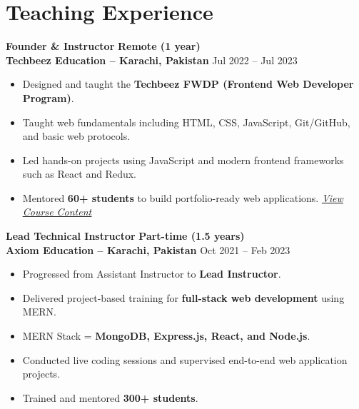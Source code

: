 \documentclass[a4paper,12pt]{article}
\begin{document}
\section*{Teaching Experience}
\vspace{2pt}

\textbf{Founder \& Instructor} \hfill \textbf{Remote (1 year)} \\
\textbf{Techbeez Education – Karachi, Pakistan} \hfill Jul 2022 -- Jul 2023
\begin{itemize}
    \item Designed and taught the \textbf{Techbeez FWDP (Frontend Web Developer Program)}.
    \item Taught web fundamentals including HTML, CSS, JavaScript, Git/GitHub, and basic web protocols.
    \item Led hands-on projects using JavaScript and modern frontend frameworks such as React and Redux.
    \item Mentored \textbf{60+ students} to build portfolio-ready web applications. \hfill \textit{\href{https://drive.google.com/drive/folders/1F0KtN6dNdHOWCGQpFw13_GGI_SMug7X_?usp=sharing}{\faLink \underline{View Course Content}}}
\end{itemize}

\textbf{Lead Technical Instructor} \hfill \textbf{Part-time (1.5 years)} \\
\textbf{Axiom Education – Karachi, Pakistan} \hfill Oct 2021 -- Feb 2023
\begin{itemize}
    \item Progressed from Assistant Instructor to \textbf{Lead Instructor}.
    \item Delivered project-based training for \textbf{full-stack web development} using MERN.
    \item MERN Stack = \textbf{MongoDB, Express.js, React, and Node.js}.
    \item Conducted live coding sessions and supervised end-to-end web application projects.
    \item Trained and mentored \textbf{300+ students}.
\end{itemize}
\end{document}
